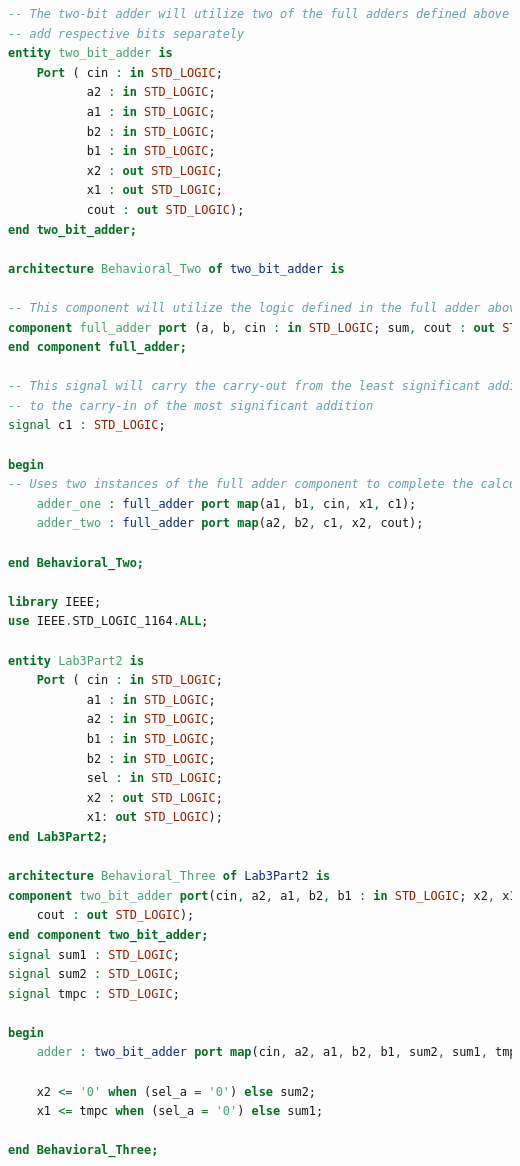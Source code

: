 \documentclass[11pt]{article}
\begin{document}
\begin{appendices}
\begin{lstlisting}[language=VHDL]
-- The two-bit adder will utilize two of the full adders defined above to 
-- add respective bits separately
entity two_bit_adder is
    Port ( cin : in STD_LOGIC;
           a2 : in STD_LOGIC;
           a1 : in STD_LOGIC;
           b2 : in STD_LOGIC;
           b1 : in STD_LOGIC;
           x2 : out STD_LOGIC;
           x1 : out STD_LOGIC;
           cout : out STD_LOGIC);
end two_bit_adder;

architecture Behavioral_Two of two_bit_adder is

-- This component will utilize the logic defined in the full adder above
component full_adder port (a, b, cin : in STD_LOGIC; sum, cout : out STD_LOGIC);
end component full_adder;

-- This signal will carry the carry-out from the least significant addition
-- to the carry-in of the most significant addition
signal c1 : STD_LOGIC;

begin
-- Uses two instances of the full adder component to complete the calculation
    adder_one : full_adder port map(a1, b1, cin, x1, c1);
    adder_two : full_adder port map(a2, b2, c1, x2, cout);

end Behavioral_Two;

library IEEE;
use IEEE.STD_LOGIC_1164.ALL;

entity Lab3Part2 is
    Port ( cin : in STD_LOGIC;
           a1 : in STD_LOGIC;
           a2 : in STD_LOGIC;
           b1 : in STD_LOGIC;
           b2 : in STD_LOGIC;
           sel : in STD_LOGIC;
           x2 : out STD_LOGIC;
           x1: out STD_LOGIC);
end Lab3Part2;

architecture Behavioral_Three of Lab3Part2 is
component two_bit_adder port(cin, a2, a1, b2, b1 : in STD_LOGIC; x2, x1, 
	cout : out STD_LOGIC);
end component two_bit_adder;
signal sum1 : STD_LOGIC;
signal sum2 : STD_LOGIC;
signal tmpc : STD_LOGIC;

begin
    adder : two_bit_adder port map(cin, a2, a1, b2, b1, sum2, sum1, tmpc);
    
    x2 <= '0' when (sel_a = '0') else sum2;
    x1 <= tmpc when (sel_a = '0') else sum1;    

end Behavioral_Three;
\end{lstlisting}


\end{appendices}
\end{document}
